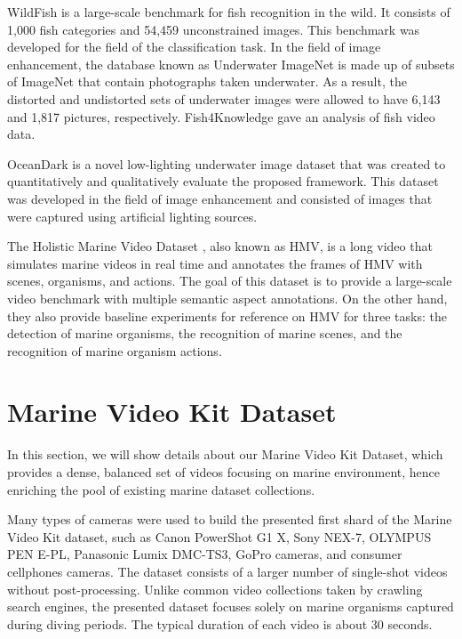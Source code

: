 \documentclass[runningheads]{llncs}
\begin{document}
WildFish \cite{zhuang2018wildfish} is a large-scale benchmark for fish recognition in the wild. It consists of 1,000 fish categories and 54,459 unconstrained images. This benchmark was developed for the field of the classification task. In the field of image enhancement, the database known as Underwater ImageNet \cite{fabbri2018icra} is made up of subsets of ImageNet \cite{imagenet} that contain photographs taken underwater. As a result, the distorted and undistorted sets of underwater images were allowed to have 6,143 and 1,817 pictures, respectively. Fish4Knowledge \cite{fisher2016fish4knowledge} gave an analysis of fish video data. 

OceanDark \cite{porto2019} is a novel low-lighting underwater image dataset that was created to quantitatively and qualitatively evaluate the proposed framework. This dataset was developed in the field of image enhancement and consisted of images that were captured using artificial lighting sources.

The Holistic Marine Video Dataset \cite{hmv2021}, also known as HMV, is a long video that simulates marine videos in real time and annotates the frames of HMV with scenes, organisms, and actions. The goal of this dataset is to provide a large-scale video benchmark with multiple semantic aspect annotations. On the other hand, they also provide baseline experiments for reference on HMV for three tasks: the detection of marine organisms, the recognition of marine scenes, and the recognition of marine organism actions.



\section{Marine Video Kit Dataset}
\label{sec:marine_kit}
In this section, we will show details about our Marine Video Kit Dataset, which provides a dense, balanced set of videos focusing on marine environment, hence enriching the pool of existing marine dataset collections.

Many types of cameras were used to build the presented first shard of the Marine Video Kit dataset, such as Canon PowerShot G1 X, Sony NEX-7, OLYMPUS PEN E-PL, Panasonic Lumix DMC-TS3, GoPro cameras, and consumer cellphones cameras. The dataset consists of a larger number of single-shot videos without post-processing. Unlike common video collections taken by crawling search engines, the presented dataset focuses solely on marine organisms captured during diving periods. The typical duration of each video is about 30 seconds.
\end{document}
